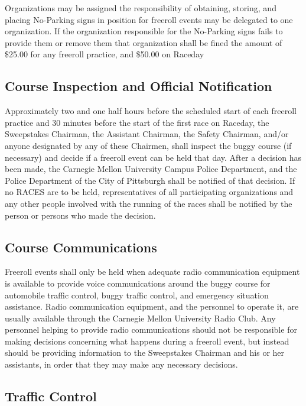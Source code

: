 	Organizations may be assigned the responsibility of obtaining, storing, and placing No-Parking signs in position for freeroll events may be delegated to one organization. If the organization responsible for the No-Parking signs fails to provide them or remove them that organization shall be fined the amount of \$25.00 for any freeroll practice, and \$50.00 on Raceday

	
\subsection{Course Inspection and Official Notification}

	Approximately two and one half hours before the scheduled start of each freeroll practice and 30 minutes before the start of the first race on Raceday, the Sweepstakes Chairman, the Assistant Chairman, the Safety Chairman, and/or anyone designated by any of these Chairmen, shall inspect the buggy course (if necessary) and decide if a freeroll event can be held that day. After a decision has been made, the Carnegie Mellon University Campus Police Department, and the Police Department of the City of Pittsburgh shall be notified of that decision. If no RACES are to be held, representatives of all participating organizations and any other people involved with the running of the races shall be notified by the person or persons who made the decision.


\subsection{Course Communications}

	Freeroll events shall only be held when adequate radio communication equipment is available to provide voice communications around the buggy course for automobile traffic control, buggy traffic control, and emergency situation assistance. Radio communication equipment, and the personnel to operate it, are usually available through the Carnegie Mellon University Radio Club. Any personnel helping to provide radio communications should not be responsible for making decisions concerning what happens during a freeroll event, but instead should be providing information to the Sweepstakes Chairman and his or her assistants, in order that they may make any necessary decisions.
	
	
\subsection{Traffic Control}

